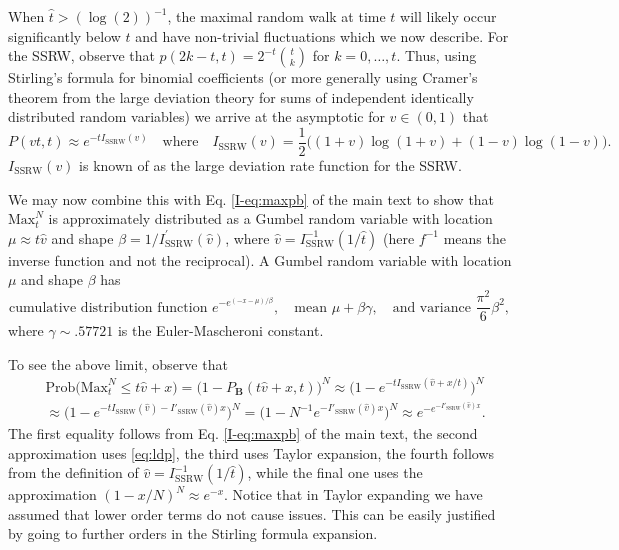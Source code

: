 \documentclass[letter,reqno, 11pt, oneside]{amsart}
\def\maxnt{\mathrm{Max}^{N}_t}
\begin{document}
When $\hat{t}> (\log(2))^{-1}$, the maximal random walk at time $t$ will likely occur significantly below $t$ and have non-trivial fluctuations which we now describe. For the SSRW, observe that $p(2k-t,t) =2^{-t} {t\choose k}$ for $k=0,\ldots, t$. Thus, using Stirling's formula for binomial coefficients (or more generally using Cramer's theorem from the large deviation theory for sums of independent identically distributed random variables) we arrive at the asymptotic for $v\in (0,1)$ that
\begin{equation}\label{eq:ldp}
P(vt,t) \approx e^{- t I_{\mathrm{SSRW}}(v)}\quad\textrm{where}\quad I_{\mathrm{SSRW}}(v) = \frac{1}{2}\big((1+v)\log(1+v) + (1-v)\log(1-v)\big).
\end{equation}
$I_{\mathrm{SSRW}}(v)$ is known of as the large deviation rate function for the SSRW.

We may now combine this with Eq. \eqref{I-eq:maxpb}  of the main text to show that
$\maxnt$ is approximately distributed as a Gumbel random variable with location
$\mu \approx t\hat v$ and shape  $\beta= 1/I_{\mathrm{SSRW}}^{\prime}(\hat v)$, where $\hat v=I_{\mathrm{SSRW}}^{-1}(1/\hat{t})$ (here $f^{-1}$ means the inverse function and not the reciprocal). A Gumbel random variable with location $\mu$ and shape $\beta$ has
\begin{equation}\label{eq:Gumbel}
\textrm{cumulative distribution function } e^{-e^{(-x-\mu)/\beta}},\quad \textrm{mean } \mu+\beta\gamma, \quad \textrm{and variance } \frac{\pi^2}{6}\beta^2,
\end{equation}
where $\gamma\sim .57721$ is the Euler-Mascheroni constant.


To see the above limit, observe that
\begin{align*}
&\mathrm{Prob}\big(\maxnt \leq t\hat{v}+x\big) = \big(1-P_{\mathbf{B}}(t\hat{v}+x,t)\big)^N \approx \big(1-  e^{- t I_{\mathrm{SSRW}}(\hat{v}+x/t)} \big)^N\\
&\approx \big(1-  e^{- t I_{\mathrm{SSRW}}(\hat{v}) - I'_{\mathrm{SSRW}}(\hat{v})x} \big)^N
=  \big(1-  N^{-1} e^{- I'_{\mathrm{SSRW}}(\hat{v})x} \big)^N \approx e^{-e^{- I'_{\mathrm{SSRW}}(\hat{v})x}}.
\end{align*}
The first equality follows from  Eq. \eqref{I-eq:maxpb}  of the main text, the second approximation uses \eqref{eq:ldp}, the third uses Taylor expansion, the fourth follows from the definition of $\hat v=I_{\mathrm{SSRW}}^{-1}(1/\hat{t})$, while the final one uses the approximation $(1-x/N)^{N}\approx e^{-x}$. Notice that in Taylor expanding we have assumed that lower order terms do not cause issues. This can be easily justified by going to further orders in the Stirling formula expansion.
\end{document}
